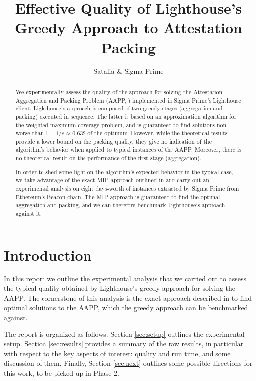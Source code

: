 \documentclass{article}
\title{Effective Quality of Lighthouse's\\Greedy Approach to Attestation Packing}
\author{Satalia \& Sigma Prime}
\begin{document}
\maketitle{}

\begin{abstract}
We experimentally assess the quality of the approach for solving the
Attestation Aggregation and Packing Problem (AAPP, \cite{Satalia22a})
implemented in Sigma Prime's Lighthouse client. Lighthouse's approach is
composed of two greedy stages (aggregation and packing) executed in sequence.
The latter is based on an approximation algorithm for the weighted maximum
coverage problem, and is guaranteed to find solutions non-worse than $1-1/e
\approx 0.632$ of the optimum. However, while the theoretical results provide a
lower bound on the packing quality, they give no indication of the algorithm's
behavior when applied to typical instances of the AAPP. Moreover, there is no
theoretical result on the performance of the first stage (aggregation).

In order to shed some light on the algorithm's expected behavior in the
typical case, we take advantage of the exact MIP approach outlined in
\cite{Satalia22b} and carry out an experimental analysis on eight days-worth of
instances extracted by Sigma Prime from Ethereum's Beacon chain. The MIP
approach is guaranteed to find the optimal aggregation and packing, and we can
therefore benchmark Lighthouse's approach against it.
\end{abstract}

\tableofcontents


\section{Introduction}

In this report we outline the experimental analysis that we carried out to
assess the typical quality obtained by Lighthouse's greedy approach for solving
the AAPP. The cornerstone of this analysis is the exact approach described in
\cite{Satalia22b} to find optimal solutions to the AAPP, which the greedy
approach can be benchmarked against.

The report is organized as follows. Section \ref{sec:setup} outlines the
experimental setup. Section \ref{sec:results} provides a summary of the raw
results, in particular with respect to the key aspects of interest: quality and
run time, and some discussion of them. Finally, Section \ref{sec:next} outlines
some possible directions for this work, to be picked up in Phase 2.
\end{document}
